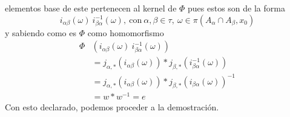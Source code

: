 elementos base de este pertenecen al kernel de \(\Phi\) pues estos son
de la forma
\[ i_{\alpha \beta} (\omega) \ i_{\beta \alpha}^{-1} (\omega) ,
  \ \text{con} \ \alpha,\beta \in \tau,\ \omega \in \pi(A_\alpha \cap
  A_\beta , x_0)\]
y sabiendo como es \(\Phi\) como homomorfismo
\begin{align*}
  \Phi &\left( i_{\alpha \beta} (\omega) \ i_{\beta \alpha}^{-1} (\omega) \right) \\
       &= j_{\alpha,*} \left(  i_{\alpha \beta} (\omega) \right) * j_{\beta,*} \left( i_{\beta \alpha}^{-1} (\omega) \right) \\
       &= j_{\alpha,*} \left(  i_{\alpha \beta} (\omega) \right) * j_{\beta,*} \left( i_{\beta \alpha} (\omega) \right)^{-1} \\
       &= w * w^{-1} = e
\end{align*}
Con esto
declarado, podemos proceder a la demostración.
